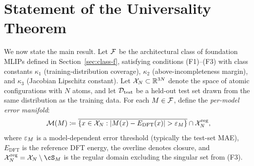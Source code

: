 \section{Statement of the Universality Theorem}\label{sec:theorem}

We now state the main result. Let $\mathcal{F}$ be the architectural class of foundation MLIPs defined in Section~\ref{sec:class-f}, satisfying conditions (F1)--(F3) with class constants $\kappa_1$ (training-distribution coverage), $\kappa_2$ (above-incompleteness margin), and $\kappa_3$ (Jacobian Lipschitz constant). Let $\mathcal{X}_N \subset \mathbb{R}^{3N}$ denote the space of atomic configurations with $N$ atoms, and let $\mathcal{D}_{\text{test}}$ be a held-out test set drawn from the same distribution as the training data. For each $M \in \mathcal{F}$, define the \emph{per-model error manifold}:
\begin{equation}\label{eq:error-manifold}
    \mathcal{M}(M) \coloneqq \overline{\{x \in \mathcal{X}_N : |M(x) - E_{\text{DFT}}(x)| > \varepsilon_M\}} \cap \mathcal{X}_N^{\text{reg}},
\end{equation}
where $\varepsilon_M$ is a model-dependent error threshold (typically the test-set MAE), $E_{\text{DFT}}$ is the reference DFT energy, the overline denotes closure, and $\cX_N^{\text{reg}} = \cX_N \setminus \cS_M$ is the regular domain excluding the singular set from (F3).

